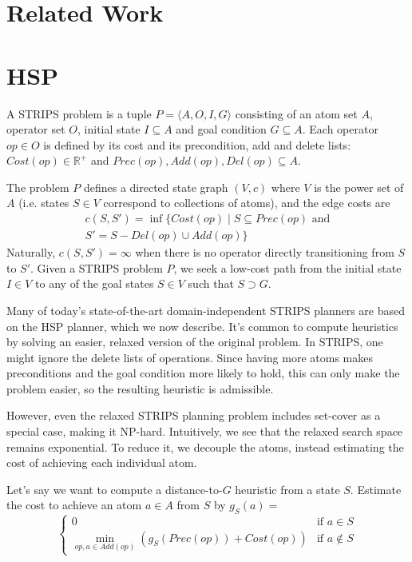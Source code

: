 \documentclass[letterpaper]{article}
\begin{document}
\section{Related Work}



\section{HSP}

A STRIPS problem is a tuple $P = \langle A,O,I,G\rangle$ consisting of an atom set $A$, operator set $O$, initial state $I \subseteq A$ and goal condition $G \subseteq A$.
Each operator $op\in O$ is defined by its cost and its precondition, add and delete lists: $Cost(op) \in \mathbb{R}^+$ and $Prec(op),Add(op),Del(op) \subseteq A$.

The problem $P$ defines a directed state graph $(V,c)$ where $V$ is the power set of $A$ (i.e. states $S\in V$ correspond to collections of atoms), and the edge costs are
\begin{eqnarray*} c(S,S') = \inf\{Cost(op) \mid S\subseteq Prec(op)\text{ and}
\\S' = S - Del(op) \cup Add(op)\} \end{eqnarray*}
Naturally, $c(S,S') = \infty$ when there is no operator directly transitioning from $S$ to $S'$.
Given a STRIPS problem $P$, we seek a low-cost path from the initial state $I\in V$ to any of the goal states $S\in V$ such that $S \supset G$.

Many of today's state-of-the-art domain-independent STRIPS planners are based on the HSP planner, which we now describe.
It's common to compute heuristics by solving an easier, relaxed version of the original problem. In STRIPS, one might ignore the delete lists of operations.
Since having more atoms makes preconditions and the goal condition more likely to hold, this can only make the problem easier, so the resulting heuristic is admissible.

However, even the relaxed STRIPS planning problem includes set-cover as a special case, making it NP-hard.
Intuitively, we see that the relaxed search space remains exponential.
To reduce it, we decouple the atoms, instead estimating the cost of achieving each individual atom.

Let's say we want to compute a distance-to-$G$ heuristic from a state $S$. Estimate the cost to achieve an atom $a\in A$ from $S$ by $g_S(a) = $
\[\begin{cases} 0  &\mbox{if } a \in S
\\ \min_{op,a\in Add(op)} \left(g_S(Prec(op)) + Cost(op)\right)  &\mbox{if } a \notin S \end{cases}\]
\end{document}
